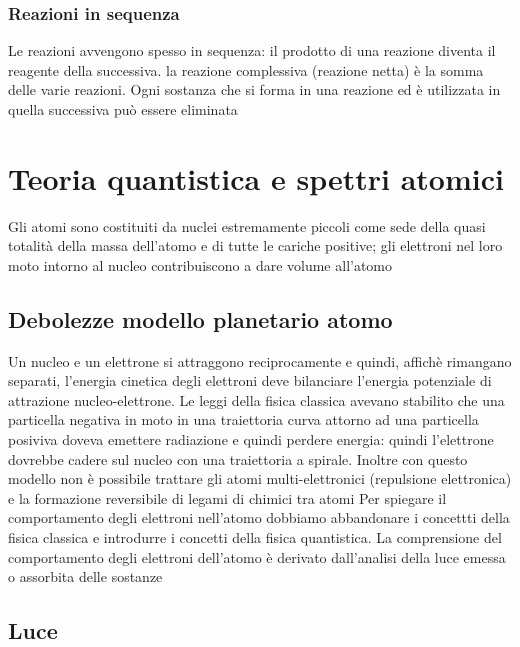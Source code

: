 \documentclass[a4paper,11pt]{report}
\begin{document}
\subsection*{Reazioni in sequenza}
Le reazioni avvengono spesso in sequenza: il prodotto di una reazione diventa il reagente della successiva. la reazione complessiva (reazione netta) è la somma delle varie reazioni. Ogni sostanza che si forma in una reazione ed è utilizzata in quella successiva può essere eliminata

\chapter{Teoria quantistica e spettri atomici}

Gli atomi sono costituiti da nuclei estremamente piccoli come sede della quasi totalità della massa dell'atomo e di tutte le cariche positive; gli elettroni nel loro moto intorno al nucleo contribuiscono a dare volume all'atomo

\section{Debolezze modello planetario atomo}

Un nucleo e un elettrone si attraggono reciprocamente e quindi, affichè rimangano separati, l'energia cinetica degli elettroni deve bilanciare l'energia potenziale di attrazione nucleo-elettrone. Le leggi della fisica classica avevano stabilito che una particella negativa in moto in una traiettoria curva attorno ad una particella posiviva doveva emettere radiazione e quindi perdere energia: quindi l'elettrone dovrebbe cadere sul nucleo con una traiettoria a spirale. Inoltre con questo modello non è possibile trattare gli atomi multi-elettronici (repulsione elettronica) e la formazione reversibile di legami di chimici tra atomi \newline
Per spiegare il comportamento degli elettroni nell'atomo dobbiamo abbandonare i concettti della fisica classica e introdurre i concetti della fisica quantistica. La comprensione del comportamento degli elettroni dell'atomo è derivato dall'analisi della luce emessa o assorbita delle sostanze

\section{Luce}
\end{document}
